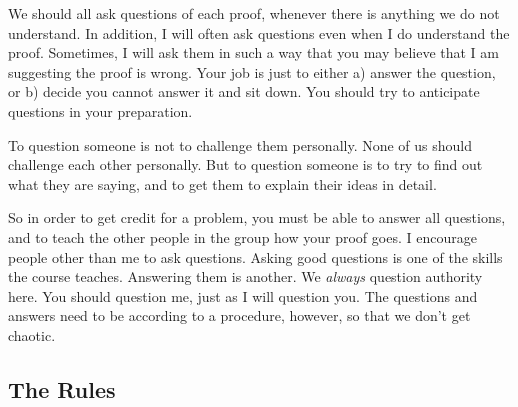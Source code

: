 \documentclass{article}
\begin{document}
We should all ask questions of each proof, whenever there is anything we do not understand. In addition, I will often ask questions even when I do understand the proof. Sometimes, I will ask them in such a way that you may believe that I am suggesting the proof is wrong. Your job is just to either a) answer the question, or b) decide you cannot answer it and sit down. You should try to anticipate questions in your preparation.

To question someone is not to challenge them personally. None of us should challenge each other personally. But to question someone is to try to find out what they are saying, and to get them to explain their ideas in detail.

So in order to get credit for a problem, you must be able to answer all questions, and to teach the other people in the group how your proof goes. I encourage people other than me to ask questions. Asking good questions is one of the skills the course teaches. Answering them is another. We \emph{always} question authority here. You should question me, just as I will question you. The questions and answers need to be according to a procedure, however, so that we don't get chaotic.


\subsection{The Rules}
\end{document}
